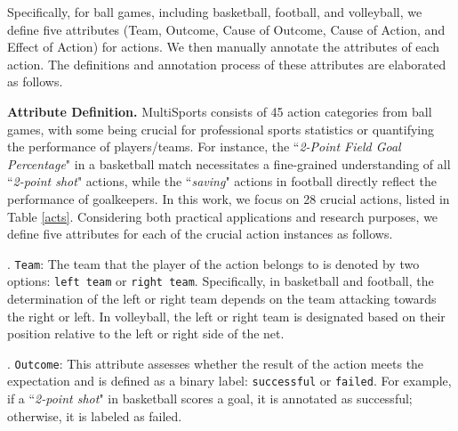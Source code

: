 Specifically, for ball games, including basketball, football, and volleyball, we define five attributes (Team, Outcome, Cause of Outcome, Cause of Action, and Effect of Action) for actions. We then manually annotate the attributes of each action. The definitions and annotation process of these attributes are elaborated as follows.

\noindent\textbf{Attribute Definition.} MultiSports consists of 45 action categories from ball games, with some being crucial for professional sports statistics or quantifying the performance of players/teams. For instance, the ``\textit{2-Point Field Goal Percentage}" in a basketball match necessitates a fine-grained understanding of all ``\textit{2-point shot}" actions, while the ``\textit{saving}" actions in football directly reflect the performance of goalkeepers. In this work, we focus on 28 crucial actions, listed in Table \ref{acts}. Considering both practical applications and research purposes, we define five attributes for each of the crucial action instances as follows.

. \texttt{Team}: The team that the player of the action belongs to is denoted by two options: \texttt{left team} or \texttt{right team}. Specifically, in basketball and football, the determination of the left or right team depends on the team attacking towards the right or left. In volleyball, the left or right team is designated based on their position relative to the left or right side of the net.

. \texttt{Outcome}: This attribute assesses whether the result of the action meets the expectation and is defined as a binary label: \texttt{successful} or \texttt{failed}. For example, if a ``\textit{2-point shot}" in basketball scores a goal, it is annotated as successful; otherwise, it is labeled as failed.

